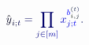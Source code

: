 \documentclass[12pt]{article}
\begin{document}
\makeatletter
\renewcommand*{\@textcolor}[3]{%
  \protect\leavevmode
  \begingroup
    \color#1{#2}#3%
  \endgroup
}
\makeatother
\begin{displaymath}
{\mathcolor[RGB]{0,0,15}{\hat { \mathcolor[RGB]{0,0,30}{y} } }} _ { \mathcolor[RGB]{0,0,45}{i} \mathcolor[RGB]{0,0,60}{;} \mathcolor[RGB]{0,0,75}{t} } \mathcolor[RGB]{0,0,90}{=} \mathcolor[RGB]{0,0,105}{\prod} _ { \mathcolor[RGB]{0,0,120}{j} \mathcolor[RGB]{0,0,135}{\in} \mathcolor[RGB]{0,0,150}{[} \mathcolor[RGB]{0,0,165}{m} \mathcolor[RGB]{0,0,180}{]} } \mathcolor[RGB]{0,0,195}{x} _ { \mathcolor[RGB]{0,0,210}{j} \mathcolor[RGB]{0,0,225}{;} \mathcolor[RGB]{0,0,240}{t} } ^ { \mathcolor[RGB]{0,0,255}{b} _ { \mathcolor[RGB]{0,15,0}{i} \mathcolor[RGB]{0,15,15}{,} \mathcolor[RGB]{0,15,30}{j} } ^ { \mathcolor[RGB]{0,15,45}{(} \mathcolor[RGB]{0,15,60}{t} \mathcolor[RGB]{0,15,75}{)} } } \mathcolor[RGB]{0,15,90}{.}
\end{displaymath}
\end{document}
